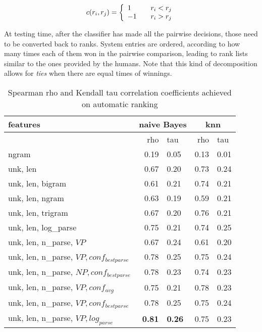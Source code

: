 \documentclass[11pt]{article}
\begin{document}
\[
c(r_i, r_j) = \left\{
  \begin{array}{l l}
    1 & \quad r_i < r_j \\
    -1 & \quad r_i > r_j \\
  \end{array} \right.
\] 

At testing time, after the classifier has made all the pairwise decisions, those
need to be converted back to ranks. System entries are ordered, according to how
many times each of them won in the pairwise comparison, leading to rank lists
similar to the ones provided by the humans. Note that this kind of
decomposition allows for \textit{ties} when there are equal times of winnings. %

\begin{table*}[h!]
\begin{center}
\begin{tabular}{|l|rl|rl|}
\hline
features & \multicolumn{2}{c|}{ naive Bayes } &  \multicolumn{2}{c|}{ knn }  \\
\hline
& rho & tau & rho & tau \\
\hline
ngram & 0.19 & 0.05 & 0.13 & 0.01  \\
unk, len & 0.67 & 0.20 & 0.73 & 0.24  \\
unk, len, bigram & 0.61 & 0.21 & 0.74 & 0.21 \\
unk, len, ngram & 0.63 & 0.19 & 0.59 & 0.21  \\
unk, len, trigram & 0.67 & 0.20 & 0.76 & 0.21  \\
unk, len, log_{parse} & 0.75 & 0.21 & 0.74 & 0.25 \\
\hline
unk, len, n_{parse}, $VP$ & 0.67 & 0.24 & 0.61 & 0.20  \\
unk, len, n_{parse}, $VP, conf_{bestparse}$ & 0.78 & 0.25 & 0.75 & 0.24 \\
unk, len, n_{parse}, $NP, conf_{bestparse}$ & 0.78 & 0.23 & 0.74 & 0.23  \\
\hline
unk, len, n_{parse}, $VP, conf_{avg}$ & 0.75 & 0.21 & 0.78 & 0.23 \\
unk, len, n_{parse}, $VP, conf_{bestparse}$ & 0.78 & 0.25 & 0.75 & 0.24 \\
unk, len, n_{parse}, $VP, log_{parse}$ & \textbf{0.81} & \textbf{0.26} & 0.75 &
0.23
\\
\hline
\end{tabular}
\end{center}
\caption{\label{font-table} Spearman rho and Kendall tau correlation
coefficients achieved on automatic ranking}
\end{table*}
\end{document}
